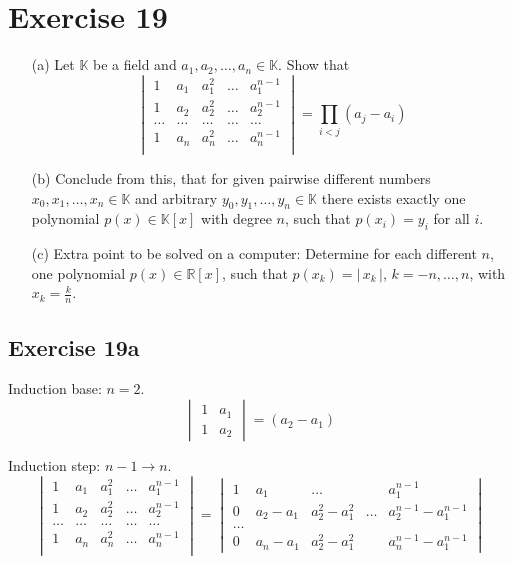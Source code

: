 \documentclass[a4paper]{article}
\theoremstyle{definition}
\newcommand\card[1]{\left|\,#1\,\right|}
\begin{document}
\section*{Exercise 19}
\begin{ex}
  \begin{enumerate}
    \item[(a)]
      Let $\mathbb K$ be a field and $a_1, a_2, \dots, a_n \in \mathbb K$. Show that
      \[
        \begin{vmatrix}
          1 & a_1 & a_1^2 & \ldots & a_1^{n-1} \\
          1 & a_2 & a_2^2 & \ldots & a_2^{n-1} \\
          \ldots & \ldots & \ldots & \ldots & \ldots \\
          1 & a_n & a_n^2 & \ldots & a_n^{n-1} \\
        \end{vmatrix}
        = \prod_{i < j} (a_j - a_i)
      \]
    \item[(b)]
      Conclude from this, that for given pairwise different numbers $x_0, x_1, \ldots, x_n \in \mathbb K$
      and arbitrary $y_0, y_1, \ldots, y_n \in \mathbb K$ there exists exactly one polynomial $p(x) \in \mathbb K[x]$ with degree $n$,
      such that $p(x_i) = y_i$ for all $i$.
    \item[(c)]
      Extra point to be solved on a computer:
      Determine for each different $n$, one polynomial $p(x) \in \mathbb R[x]$, such that $p(x_k) = \card{x_k}$, $k = -n, \ldots, n$, with $x_k = \frac{k}{n}$.
  \end{enumerate}
\end{ex}

\subsection{Exercise 19a}

Induction base: $n=2$.
\[ \begin{vmatrix} 1 & a_1 \\ 1 & a_2 \end{vmatrix} = (a_2 - a_1) \]

Induction step: $n-1 \to n$.
\[
  \begin{vmatrix}
    1 & a_1 & a_1^2 & \ldots & a_1^{n-1} \\
    1 & a_2 & a_2^2 & \ldots & a_2^{n-1} \\
    \ldots & \ldots & \ldots & \ldots & \ldots \\
    1 & a_n & a_n^2 & \ldots & a_n^{n-1} \\
  \end{vmatrix}
  = \begin{vmatrix}
    1 & a_1       & \ldots        &        & a_1^{n-1} \\
    0 & a_2 - a_1 & a_2^2 - a_1^2 & \ldots & a_2^{n-1} - a_1^{n-1} \\
    \ldots & & & & \\
    0 & a_n-a_1 & a_2^2 - a_1^2 & & a_n^{n-1} - a_1^{n-1}
  \end{vmatrix}
\]
\end{document}
